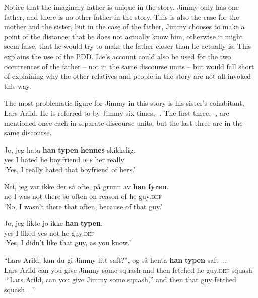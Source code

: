 \documentclass[output=paper,colorlinks,citecolor=brown]{langscibook}
\begin{document}
Notice that the imaginary father is unique in the story. Jimmy only has one father, and there is no other father in the story. This is also the case for the mother and the sister, but in the case of the father, Jimmy chooses to make a point of the distance; that he does not actually know him, otherwise it might seem false, that he would try to make the father closer than he actually is. This explains the use of the PDD. Lie’s account could also be used for the two occurrences of the father – not in the same discourse units – but would fall short of explaining why the other relatives and people in the story are not all invoked this way.

The most problematic figure for Jimmy in this story is his sister’s cohabitant, Lars Arild. He is referred to by Jimmy six times, -. The first three, -, are mentioned once each in separate discourse units, but the last three are in the same discourse.

\ea\label{ex:johannessen:22}
 \gll Jo, jeg hata \textbf{han} \textbf{typen} \textbf{hennes} skikkelig.\\
     yes I hated he boy.friend.\textsc{def} her really\\
\glt ‘Yes, I really hated that boyfriend of hers.’ \citep[65, bottom]{Rishoi2014}
\z

\ea\label{ex:johannessen:23}
 \gll Nei, jeg var ikke der så ofte, på grunn av \textbf{han} \textbf{fyren}.\\
     no I was not there so often on reason of he guy.\textsc{def} \\
\glt ‘No, I wasn’t there that often, because of that guy.’ \citep[66, middle]{Rishoi2014}
\z

\ea\label{ex:johannessen:24}
 \gll Jo, jeg likte jo ikke \textbf{han} \textbf{typen}.\\
     yes I liked yes not he guy.\textsc{def} \\
\glt ‘Yes, I didn’t like that guy, as you know.’ \citep[67, top]{Rishoi2014}
\z

\ea\label{ex:johannessen:25}
 \gll “Lars Arild, kan du gi Jimmy litt saft?”, og så henta \textbf{han} \textbf{typen} saft ... \\
     Lars Arild can you give Jimmy some squash and then fetched he guy.\textsc{def} squash \\
\glt ‘“Lars Arild, can you give Jimmy some squash,” and then that guy fetched squash ...’ \citep[68, middle]{Rishoi2014}
\z
\end{document}
